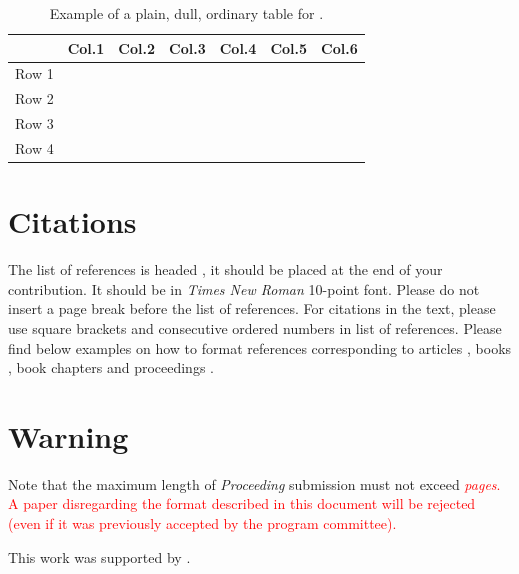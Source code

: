 \documentclass[long, final]{jobim2017}
\begin{document}
\begin{table}[ht]
  \begin{center}
    \begin{tabular}{|l|c|c|c|c|c|c|}
      \hline
              & Col.1 & Col.2 & Col.3 & Col.4 & Col.5 & Col.6 \\
       \hline
       Row 1 &        &       &       &       &       &      \\
       \hline
       Row 2 &        &       &       &       &       &      \\
       \hline
       Row 3 &        &       &       &       &       &      \\
       \hline
       Row 4 &        &       &       &       &       &      \\
       \hline
    \end{tabular}
  \end{center}
  \caption{Example of a plain, dull, ordinary table for \jobim.}
  \label{tab:exple}
\end{table}

\section{Citations}
\label{sec:citations}

The list of references is headed
\emph{\refname}, it should be placed at the end of your
contribution. It should be in \emph{Times New Roman} 10-point font. Please do not
insert a page break before the list of references. For citations in the text,
please use square brackets \cite{Sokal1996} and consecutive ordered numbers
\cite{GastelDay2016,Cormode2012} in list of references.
Please find below examples on how to format references corresponding to
articles \cite{Sokal1996}, books \cite{GastelDay2016}, book chapters and proceedings
\cite{Cormode2012}.

\section{Warning} 
Note that the maximum length of \emph{Proceeding} submission must not exceed \textcolor{red}{\emph{\JobimLongPaperMaxPages{} pages}. A paper disregarding the
format described in this document will be rejected (even if it was previously accepted 
by the program committee).}

\begin{acknowledgements}
  \label{sec:acknowledgements}
  
 This work was supported by .
\end{acknowledgements}


 
 
\end{document}
